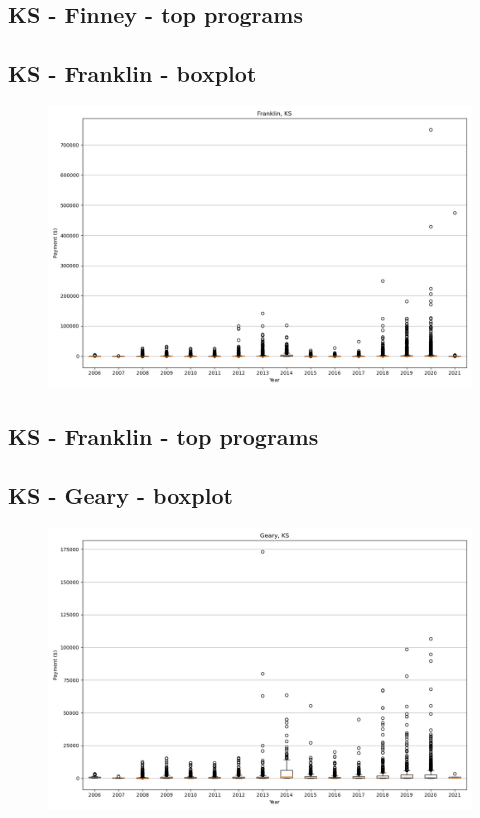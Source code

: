 \subsection*{KS - Finney - top programs}

\newpage
\subsection*{KS - Franklin - boxplot}
\begin{figure}[h]
\centering
\includegraphics[width=7in]{../output/boxplots/counties/Franklin-KS_boxplot.png}
\end{figure}


\subsection*{KS - Franklin - top programs}

\newpage
\subsection*{KS - Geary - boxplot}
\begin{figure}[h]
\centering
\includegraphics[width=7in]{../output/boxplots/counties/Geary-KS_boxplot.png}
\end{figure}


